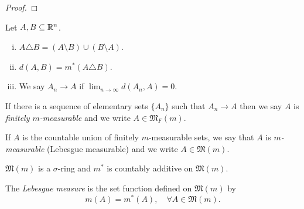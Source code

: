 \documentclass[11pt]{article}
\begin{document}
\end{definition}

\begin{definition}
  If there is a sequence of elementary sets $\{ A_{n} \}$ such that $A_{n} \to A$ then we say $A$ is \emph{finitely $m$-measurable} and we write $A \in \mathfrak{M}_{F}(m)$.
\end{definition}

\begin{definition}
  If $A$ is the countable union of finitely $m$-measurable sets, we say that $A$ is \emph{$m$-measurable} (Lebesgue measurable) and we write $A \in \mathfrak{M}(m)$.
\end{definition}

\begin{theorem}
  $\mathfrak{M}(m)$ is a $\sigma$-ring and $m^{*}$ is countably additive on $\mathfrak{M}(m)$.
\end{theorem}

\begin{definition}
  The \emph{Lebesgue measure} is the set function defined on $\mathfrak{M}(m)$ by $$m(A) = m^{*}(A), \quad \forall A \in \mathfrak{M}(m).$$
\end{definition}

\normalfont
\end{document}
